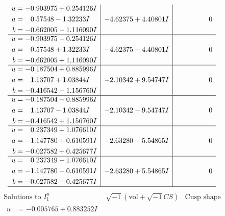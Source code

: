 \documentclass[1p]{elsarticle_modified}
\theoremstyle{definition}
\newcommand{\I}{\sqrt{-1}}
\begin{document}
$$\begin{array}{c|c|c}
\begin{aligned}
u &= -0.903975 + 0.254126 I \\
a &= \phantom{-}0.57548 - 1.32233 I \\
b &= -0.662005 - 1.116090 I\end{aligned}
 & -4.62375 + 4.40801 I & \phantom{-0.000000 } 0 \\ \hline\begin{aligned}
u &= -0.903975 - 0.254126 I \\
a &= \phantom{-}0.57548 + 1.32233 I \\
b &= -0.662005 + 1.116090 I\end{aligned}
 & -4.62375 - 4.40801 I & \phantom{-0.000000 } 0 \\ \hline\begin{aligned}
u &= -0.187504 + 0.885996 I \\
a &= \phantom{-}1.13707 + 1.03844 I \\
b &= -0.416542 - 1.156760 I\end{aligned}
 & -2.10342 + 9.54747 I & \phantom{-0.000000 } 0 \\ \hline\begin{aligned}
u &= -0.187504 - 0.885996 I \\
a &= \phantom{-}1.13707 - 1.03844 I \\
b &= -0.416542 + 1.156760 I\end{aligned}
 & -2.10342 - 9.54747 I & \phantom{-0.000000 } 0 \\ \hline\begin{aligned}
u &= \phantom{-}0.237349 + 1.076610 I \\
a &= -1.147780 + 0.610591 I \\
b &= -0.027582 + 0.425677 I\end{aligned}
 & -2.63280 - 5.54865 I & \phantom{-0.000000 } 0 \\ \hline\begin{aligned}
u &= \phantom{-}0.237349 - 1.076610 I \\
a &= -1.147780 - 0.610591 I \\
b &= -0.027582 - 0.425677 I\end{aligned}
 & -2.63280 + 5.54865 I & \phantom{-0.000000 } 0\\
 \hline 
 \end{array}$$\newpage$$\begin{array}{c|c|c}  
\text{Solutions to }I^u_{1}& \I (\text{vol} + \sqrt{-1}CS) & \text{Cusp shape}\\
 \hline 
\begin{aligned}
u &= -0.005765 + 0.883252 I \\

\end{aligned}
\end{array}$$
\end{document}
